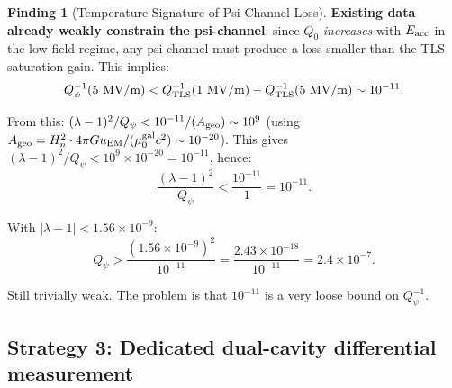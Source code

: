 \documentclass[11pt]{article}
\newcommand{\lam}{\lambda}
\newcommand{\ee}[1]{\times 10^{#1}}
\newcommand{\Qpsi}{Q_\psi}
\newcommand{\Heff}{H_n}
\newcommand{\muG}{\mu_0^{\rm gal}}
\newcommand{\lbone}{|\lam - 1|}
\theoremstyle{definition}
\newtheorem{finding}[theorem]{Finding}
\theoremstyle{remark}
\begin{document}
\begin{finding}[Temperature Signature of Psi-Channel Loss]
\textbf{Existing data already weakly constrain the psi-channel}:
since $Q_0$ \emph{increases} with $E_{\rm acc}$ in the low-field
regime, any psi-channel must produce a loss smaller than the
TLS saturation gain. This implies:
\begin{equation}
Q_\psi^{-1}(5~\text{MV/m}) < Q_{\rm TLS}^{-1}(1~\text{MV/m})
- Q_{\rm TLS}^{-1}(5~\text{MV/m}) \sim 10^{-11}.
\end{equation}

From this: $(\lam-1)^2/\Qpsi < 10^{-11}/(A_{\rm geo}) \sim 10^{9}$
(using $A_{\rm geo} = \Heff^2 \cdot 4\pi G u_{\rm EM}/(\muG c^2)
\sim 10^{-20}$). This gives $(\lam-1)^2/\Qpsi < 10^{9} \times 10^{-20}
= 10^{-11}$, hence:
\begin{equation}
\frac{(\lam-1)^2}{\Qpsi} < \frac{10^{-11}}{1} = 10^{-11}.
\end{equation}

With $\lbone < 1.56\ee{-9}$:
\begin{equation}
\Qpsi > \frac{(1.56\ee{-9})^2}{10^{-11}} = \frac{2.43\ee{-18}}{10^{-11}}
= 2.4\ee{-7}.
\end{equation}

Still trivially weak. The problem is that $10^{-11}$ is a very loose
bound on $Q_\psi^{-1}$.
\end{finding}

\subsection{Strategy 3: Dedicated dual-cavity differential measurement}
\end{document}

